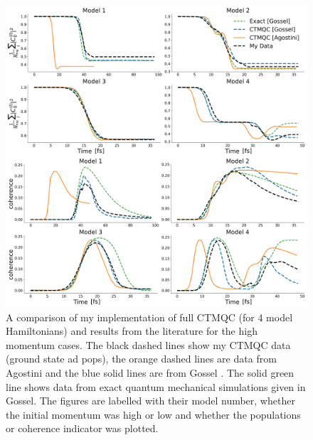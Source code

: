 \begin{figure}[ht]
	\includegraphics[width=\textwidth]{../img/CTMQC/TullyModels/CTMQC_highMom.png}
	\caption{\label{fig:LitCompCTMQCTullyHigh}A comparison of my implementation of full CTMQC (for 4 model Hamiltonians) and results from the literature for the high momentum cases. The black dashed lines show my CTMQC data (ground state ad pops), the orange dashed lines are data from Agostini \cite{agostini_quantum-classical_2016} and the blue solid lines are from Gossel \cite{gossel_coupled-trajectory_2018}. The solid green line shows data from exact quantum mechanical simulations given in Gossel. The figures are labelled with their model number, whether the initial momentum was high or low and whether the populations or coherence indicator was plotted.}
\end{figure}

